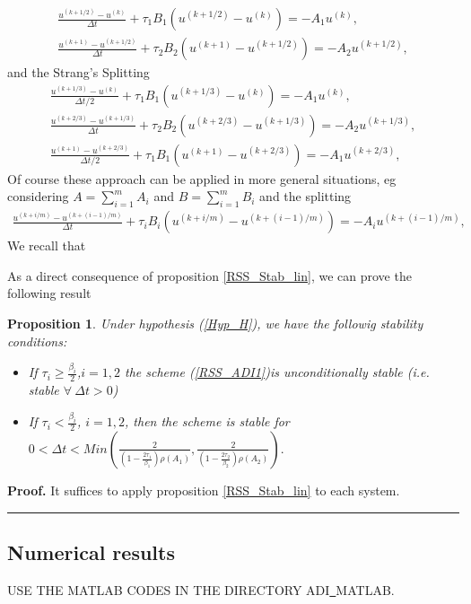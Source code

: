 \documentclass[11pt]{article}
\newenvironment{proof}[1][Proof]{\textbf{#1.} }{\ \rule{0.5em}{0.5em}}
\newtheorem{proposition}[theorem]{Proposition}
\newcommand{\Frac}[2] {\frac{\textstyle #1} {\textstyle #2}}
\begin{document}
\begin{eqnarray}
\Frac{u^{(k+1/2)}-u^{(k)}}{\Delta t} +\tau_1 B_1 (u^{(k+1/2)}-u^{(k)}) = -A_1 u^{(k)},\\
\Frac{u^{(k+1)}-u^{(k+1/2)}}{\Delta t} +\tau_2 B_2 (u^{(k+1)}-u^{(k+1/2)}) = -A_2 u^{(k+1/2)},
\label{RSS_ADI1}
\end{eqnarray}
and the Strang's Splitting
\begin{eqnarray}
\Frac{u^{(k+1/3)}-u^{(k)}}{\Delta t/2} +\tau_1 B_1 (u^{(k+1/3)}-u^{(k)}) = -A_1 u^{(k)},\\
\Frac{u^{(k+2/3)}-u^{(k+1/3)}}{\Delta t} +\tau_2 B_2 (u^{(k+2/3)}-u^{(k+1/3)}) = -A_2 u^{(k+1/3)},\\
\Frac{u^{(k+1)}-u^{(k+2/3)}}{\Delta t/2} +\tau_1 B_1 (u^{(k+1)}-u^{(k+2/3)}) = -A_1 u^{(k+2/3)},
\label{RSS_ADI2}
\end{eqnarray}
Of course these approach can be applied in more general situations, eg
considering $A=\displaystyle{\sum_{i=1}^m A_i}$ and $B =\displaystyle{\sum_{i=1}^m B_i}$ and the splitting
\begin{eqnarray}
\Frac{u^{(k+i/m)}-u^{(k+(i-1)/m)}}{\Delta t} +\tau_i B_i(u^{(k+i/m)}-u^{(k+(i-1)/m)}) = -A_i u^{(k+(i-1)/m)},
\label{RSS_ADIm}
\end{eqnarray}
We recall that


As a direct consequence of proposition \ref{RSS_Stab_lin}, we can prove the following result
\begin{proposition}
Under hypothesis (\ref{Hyp_H}), we have the followig stability conditions:
\begin{itemize}
\item If $\tau_i\ge \Frac{\beta_i}{2}$,$i=1,2$ the scheme (\ref{RSS_ADI1})is unconditionally stable (i.e. stable $\forall \ \Delta t >0$)
\item If $\tau_i < \Frac{\beta_i}{2}$, $i=1,2$, then the scheme is stable for
$
0<\Delta t < Min(\Frac{2}{\left(1-\Frac{2\tau_1}{\beta_1}\right)\rho(A_1)},\Frac{2}{\left(1-\Frac{2\tau_2}{\beta_2}\right)\rho(A_2)}).
$
\end{itemize} 
\label{RSS_Stab_ADI}
\end{proposition}
\begin{proof}
It suffices to apply proposition \ref{RSS_Stab_lin} to each system.
\end{proof}
\subsection{Numerical results}
USE THE MATLAB CODES IN THE DIRECTORY ADI\underline{\ }MATLAB.
\end{document}
